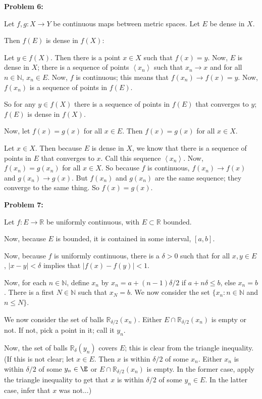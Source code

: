\documentclass[a4paper,12pt]{article}
\newcommand{\tab}{\hspace{4mm}} %
\newcommand{\shunt}{\vspace{20mm}}
\newcommand{\absval}[1]{\lvert #1 \rvert}
\newcommand{\anbrack}[1]{\left\langle #1 \right\rangle}
\newcommand{\de}{\delta}
\newcommand{\N}{\mathbb{N}}
\newcommand{\R}{\mathbb{R}}
\begin{document}
\shunt

{\bf Problem 6:}

Let $f, g: X \to Y$ be continuous maps between metric spaces. Let $E$ be dense in $X$.

Then $f(E)$ is dense in $f(X)$:

\tab Let $y \in f(X)$. Then there is a point $x \in X$ such that $f(x) = y$. Now, $E$ is dense in $X$; there is a sequence of points $\anbrack{x_n}$ such that $x_n \to x$ and for all $n \in \N$, $x_n \in E$. Now, $f$ is continuous; this means that $f(x_n) \to f(x)=y$. Now, $f(x_n)$ is a sequence of points in $f(E)$.

\tab So for any $y \in f(X)$ there is a sequence of points in $f(E)$ that converges to $y$; $f(E)$ is dense in $f(X)$.

Now, let $f(x)=g(x)$ for all $x \in E$. Then $f(x)=g(x)$ for all $x \in X$.

\tab Let $x \in X$. Then because $E$ is dense in $X$, we know that there is a sequence of points in $E$ that converges to $x$. Call this sequence $\anbrack{x_n}$. Now, $f(x_n) = g(x_n)$ for all $x \in X$. So because $f$ is continuous, $f(x_n) \to f(x)$ and $g(x_n) \to g(x)$. But $f(x_n)$ and $g(x_n)$ are the same sequence; they converge to the same thing. So $f(x) = g(x)$.

\shunt

{\bf Problem 7:}

Let $f: E \to \R$ be uniformly continuous, with $E \subset \R$ bounded.

Now, because $E$ is bounded, it is contained in some interval, $[a,b]$.

Now, because $f$ is uniformly continuous, there is a $\de >0$ such that for all $x,y \in E$, $|x-y| < \de$ implies that $\absval{f(x)-f(y)} < 1$.

Now, for each $n \in \N$, define $x_n$ by $x_n = a+ (n-1)\de/2$ if $a+n\de \leq b$, else $x_n = b$. There is a first $N \in \N$ such that $x_N = b$. We now consider the set $\{x_n: n \in \N$ and $n \leq N\}$.

We now consider the set of balls $\R_{\de/2}(x_n)$. Either $E \cap \R_{\de/2}(x_n)$ is empty or not. If not, pick a point in it; call it $y_n$.

Now, the set of balls $\R_{\de}(y_n)$ covers $E$; this is clear from the triangle inequality. (If this is not clear; let $x \in E$. Then $x$ is within $\de/2$ of some $x_n$. Either $x_n$ is within $\de/2$ of some $y_n \in \E$ or $E \cap \R_{\de/2}(x_n)$ is empty. In the former case, apply the triangle inequality to get that $x$ is within $\de/2$ of some $y_n \in E$. In the latter case, infer that $x$ was not...) %
\end{document}
